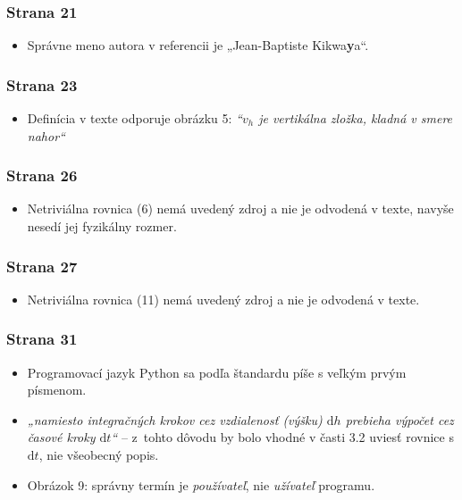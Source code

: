 \hypertarget{strana-21}{%
\subsubsection{Strana 21}\label{strana-21}}

\begin{itemize}
\tightlist
\item
  Správne meno autora v referencii je „Jean-Baptiste Kikwa\textbf{y}a“.
\end{itemize}

\hypertarget{strana-23}{%
\subsubsection{Strana 23}\label{strana-23}}

\begin{itemize}
\tightlist
\item
  Definícia v texte odporuje obrázku 5: \emph{“\(v_h\) je vertikálna
  zložka, kladná v smere nahor“}
\end{itemize}

\hypertarget{strana-26}{%
\subsubsection{Strana 26}\label{strana-26}}

\begin{itemize}
\tightlist
\item
  Netriviálna rovnica (6) nemá uvedený zdroj a nie je odvodená v texte,
  navyše nesedí jej fyzikálny rozmer.
\end{itemize}

\hypertarget{strana-27}{%
\subsubsection{Strana 27}\label{strana-27}}

\begin{itemize}
\tightlist
\item
  Netriviálna rovnica (11) nemá uvedený zdroj a nie je odvodená v texte.
\end{itemize}

\hypertarget{strana-31}{%
\subsubsection{Strana 31}\label{strana-31}}

\begin{itemize}
\tightlist
\item
  Programovací jazyk Python sa podľa štandardu píše s veľkým prvým
  písmenom.
\item
  \emph{„namiesto integračných krokov cez vzdialenosť (výšku)
  \(\mathrm{d}h\) prebieha výpočet cez časové kroky \(\mathrm{d}t\)“}
  -- z~tohto dôvodu by bolo vhodné v časti 3.2 uviesť rovnice s
  \(\mathrm{d}t\), nie všeobecný popis.
\item
  Obrázok 9: správny termín je \emph{používateľ}, nie \emph{užívateľ}
  programu.
\end{itemize}

